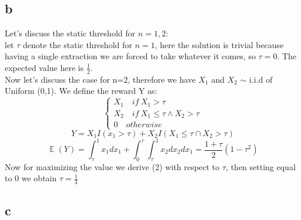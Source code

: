 \documentclass{article}
\DeclareMathOperator{\EX}{\mathbb{E}}%
\begin{document}
\subsection{b}
Let's discuss the static threshold for $n=1,2$: \\
let $\tau$ denote the static threshold for $n=1$, here the solution is trivial because having a single extraction we are forced to take whatever it comes, so $\tau = 0$. The expected value here is $\frac{1}{2}$.\\
Now let's discuss the case for n=2, therefore we have $X_{1}$ and $X_{2}$ $\sim$  i.i.d of Uniform (0,1). We define the reward Y as:\\
$$\begin{cases}
X_{1}\quad if\ X_{1} > \tau \\
X_{2}\quad if\ X_{1} \le \tau \wedge X_{2} > \tau \\
0\quad otherwise
\end{cases}$$
\begin{equation}
Y=X_{1}I(x_{1}>\tau) + X_{2}I(X_{1} \le \tau \cap X_{2} > \tau )
\end{equation}
\begin{equation}
\EX(Y)= \int_{\tau}^{1}x_{1}dx_{1}+\int_{0}^{\tau} \int_{\tau}^{1}x_{2}dx_{2}dx_{1}=\frac{1+\tau}{2} (1-\tau^{2})
\end{equation}
Now for maximizing the value we derive (2) with respect to $\tau$, then setting equal to 0 we obtain $\tau=\frac{1}{3}$ 
\subsection{c}\label{1.1}
\end{document}
